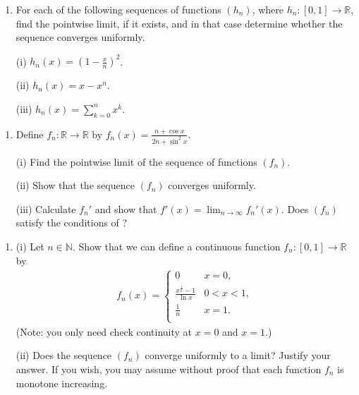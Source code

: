 \documentclass[letterpaper,10pt,english]{jupyterBook}
\begin{document}
\label{\detokenize{Problems:id57}}\begin{enumerate}
%
\setcounter{enumi}{56}
\item {} 
\sphinxAtStartPar
For each of the following sequences of functions \((h_n)\), where \(h_n\colon [0,1]\rightarrow \mathbb{R}\), find the pointwise limit, if it exists, and in that case determine whether the sequence converges uniformly.

\sphinxAtStartPar
(i) \(h_n(x) = \left(1-\frac{x}{n}\right)^2\).

\sphinxAtStartPar
(ii) \(h_n(x) = x-x^n\).

\sphinxAtStartPar
(iii) \(h_n (x) = \sum_{k=0}^n x^k\).

\end{enumerate}
\label{\detokenize{Problems:id58}}\begin{enumerate}
%
\setcounter{enumi}{57}
\item {} 
\sphinxAtStartPar
Define \(f_n\colon \mathbb{R}\rightarrow \mathbb{R}\) by \(f_n (x) = \frac{n+\cos x}{2n+\sin^2 x}\).

\sphinxAtStartPar
(i) Find the pointwise limit of the sequence of functions \((f_n)\).

\sphinxAtStartPar
(ii) Show that the sequence \((f_n)\) converges uniformly.

\sphinxAtStartPar
(iii) Calculate \(f_n'\) and show that \(f'(x) = \lim_{n\rightarrow \infty} f_n'(x)\). Does \((f_n)\) satisfy the conditions of ?

\end{enumerate}
\label{\detokenize{Problems:id59}}\begin{enumerate}
%
\setcounter{enumi}{58}
\item {} 
\sphinxAtStartPar
(i) Let \(n\in \mathbb{N}\). Show that we can define a continuous function \(f_n\colon [0,1]\rightarrow \mathbb{R}\) by
\begin{equation*}
\begin{split}
    f_n(x) = \left\{ \begin{array}{ll}
    \displaystyle 0 & x=0, \\
    \displaystyle\frac{x^{\frac{1}{n}}-1}{\ln x} & 0<x<1, \\
    \displaystyle\frac{1}{n} & x=1. \\
    \end{array} \right.
    \end{split}
\end{equation*}
\sphinxAtStartPar
(Note: you only need check continuity at \(x=0\) and \(x=1\).)

\sphinxAtStartPar
(ii) Does the sequence \((f_n)\) converge  uniformly to a limit? Justify your answer. If you wish, you may assume without proof that each function \(f_n\) is monotone increasing.

\end{enumerate}
\end{document}
